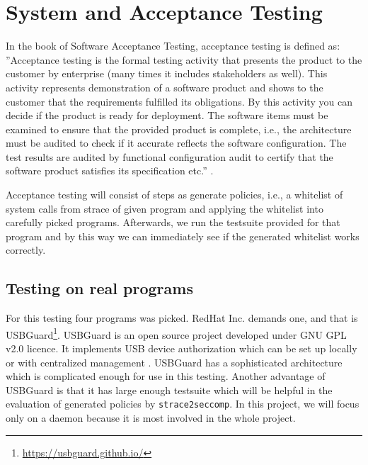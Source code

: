 
\section{System and Acceptance Testing}
\label{acceptance_testing}
In the book of Software Acceptance Testing, acceptance testing is defined as:
''Acceptance testing is the formal testing activity that presents the
product to the customer by enterprise (many times it includes stakeholders as
well). This activity represents demonstration of a software product and shows to
the customer that the requirements fulfilled its obligations. By this activity
you can decide if the product is ready for deployment. The software items must
be examined to ensure that the provided product is complete, i.e., the
architecture must be audited to check if it accurate reflects the software
configuration. The test results are audited by functional configuration audit to
certify that the software product satisfies its specification etc.''
\cite{Schmidt2013335}.

Acceptance testing will consist of steps as generate policies, i.e., a whitelist
of system calls from strace of given program and applying the whitelist into
carefully picked programs. Afterwards, we run the testsuite provided for that
program and by this way we can immediately see if the generated whitelist works
correctly.

\subsection{Testing on real programs}
For this testing four programs was picked. RedHat Inc. demands one, and that is
USBGuard\footnote{\url{https://usbguard.github.io/}}. USBGuard is an open source
project developed under GNU GPL v2.0 licence. It implements USB device
authorization which can be set up locally or with centralized
management \cite{usbguardCentralized}. USBGuard has a sophisticated architecture
which is complicated enough for use in this testing. Another advantage of
USBGuard is that it has large enough testsuite which will be helpful in the
evaluation of generated policies by \texttt{strace2seccomp}. In this project, we
will focus only on a daemon because it is most involved in the whole project.

